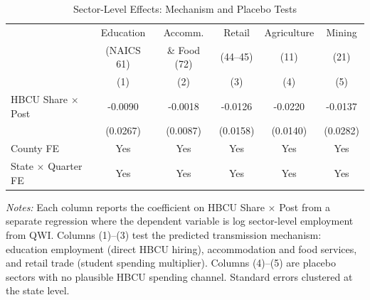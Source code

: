 
\begin{table}[t]
\centering
\caption{Sector-Level Effects: Mechanism and Placebo Tests}
\label{tab:sectors}
\begin{threeparttable}
\begin{tabular}{lccccc}
\hline\hline
 & Education & Accomm. & Retail & Agriculture & Mining \\
 & (NAICS 61) & \& Food (72) & (44--45) & (11) & (21) \\
 & (1) & (2) & (3) & (4) & (5) \\
\hline
\addlinespace
HBCU Share $\times$ Post & -0.0090 & -0.0018 & -0.0126 & -0.0220 & -0.0137 \\
 & (0.0267) & (0.0087) & (0.0158) & (0.0140) & (0.0282) \\
\addlinespace
\hline
County FE & Yes & Yes & Yes & Yes & Yes \\
State $\times$ Quarter FE & Yes & Yes & Yes & Yes & Yes \\
\hline\hline
\end{tabular}
\begin{tablenotes}\small
\item \textit{Notes:} Each column reports the coefficient on HBCU Share $\times$ Post from a separate regression where the dependent variable is log sector-level employment from QWI. Columns (1)--(3) test the predicted transmission mechanism: education employment (direct HBCU hiring), accommodation and food services, and retail trade (student spending multiplier). Columns (4)--(5) are placebo sectors with no plausible HBCU spending channel. Standard errors clustered at the state level.
\end{tablenotes}
\end{threeparttable}
\end{table}

